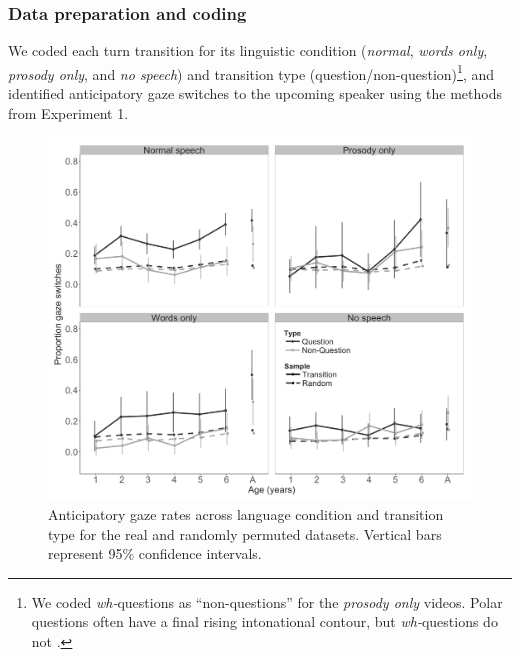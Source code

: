 \documentclass[authoryear, 12pt]{elsarticle}
\begin{document}

\subsubsection*{Data preparation and coding}
We coded each turn transition for its linguistic condition (\textit{normal}, \textit{words only}, \textit{prosody only}, and \textit{no speech}) and transition type (question/non-question)\footnote{We coded \textit{wh-}questions as ``non-questions'' for the \textit{prosody only} videos. Polar questions often have a final rising intonational contour, but \textit{wh-}questions do not  \citep{hedberg2010}.}, and identified anticipatory gaze switches to the upcoming speaker using the methods from Experiment 1.

\begin{figure}[!ht]
\begin{center}
\includegraphics[width=\textwidth]{figures/E2-samples-by-lang-groups-trans-types.png}
\end{center}
\caption{Anticipatory gaze rates across language condition and transition type for the real and randomly permuted datasets. Vertical bars represent 95\% confidence intervals.}
\label{fig:E2-randvsreal}
\end{figure}
\end{document}
